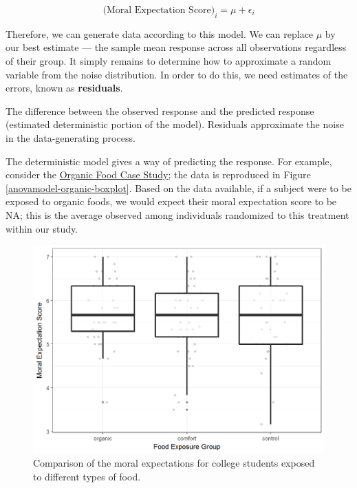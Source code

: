 \documentclass[]{book}
\theoremstyle{definition}
\theoremstyle{definition}
\theoremstyle{remark}
\let\BeginKnitrBlock\begin \let\EndKnitrBlock\end
\begin{document}
\begin{equation}
  \text{(Moral Expectation Score)}_i = \mu + \epsilon_i
  \label{eq:null-model}
\end{equation}

Therefore, we can generate data according to this model. We can replace
\(\mu\) by our best estimate --- the sample mean response across all
observations regardless of their group. It simply remains to determine
how to approximate a random variable from the noise distribution. In
order to do this, we need estimates of the errors, known as
\textbf{residuals}.

\BeginKnitrBlock{definition}[Residual]
\protect\hypertarget{def:defn-residual}{}{\label{def:defn-residual}
{} }The difference between the observed response
and the predicted response (estimated deterministic portion of the
model). Residuals approximate the noise in the data-generating process.
\EndKnitrBlock{definition}

The deterministic model gives a way of predicting the response. For
example, consider the \protect\hyperlink{CaseOrganic}{Organic Food Case
Study}; the data is reproduced in Figure
\ref{anovamodel-organic-boxplot}. Based on the data available, if a
subject were to be exposed to organic foods, we would expect their moral
expectation score to be NA; this is the average observed among
individuals randomized to this treatment within our study.

\begin{figure}

{\centering \includegraphics[width=0.8\linewidth]{./Images/anovamodel-organic-boxplot-1} 

}

\caption{Comparison of the moral expectations for college students exposed to different types of food.}\label{fig:anovamodel-organic-boxplot}
\end{figure}
\end{document}
